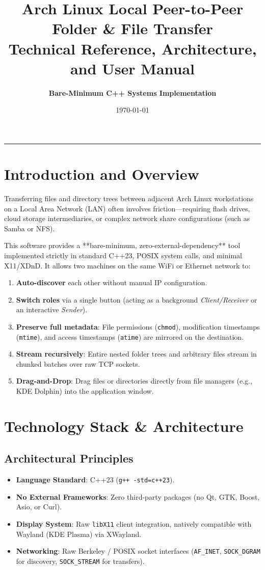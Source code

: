 \documentclass[11pt,a4paper]{article}
\title{\textbf{\Huge Arch Linux Local Peer-to-Peer Folder \& File Transfer}\\[0.3em]
\Large Technical Reference, Architecture, and User Manual}
\author{\textbf{Bare-Minimum C++ Systems Implementation}}
\date{\today}
\begin{document}
\maketitle
\tableofcontents
\vspace{1.5em}
\hrule
\vspace{1.5em}

\section{Introduction and Overview}
Transferring files and directory trees between adjacent Arch Linux workstations on a Local Area Network (LAN) often involves friction—requiring flash drives, cloud storage intermediaries, or complex network share configurations (such as Samba or NFS).

This software provides a **bare-minimum, zero-external-dependency** tool implemented strictly in standard C++23, POSIX system calls, and minimal X11/XDnD. It allows two machines on the same WiFi or Ethernet network to:
\begin{enumerate}
    \item \textbf{Auto-discover} each other without manual IP configuration.
    \item \textbf{Switch roles} via a single button (acting as a background \textit{Client/Receiver} or an interactive \textit{Sender}).
    \item \textbf{Preserve full metadata}: File permissions (\texttt{chmod}), modification timestamps (\texttt{mtime}), and access timestamps (\texttt{atime}) are mirrored on the destination.
    \item \textbf{Stream recursively}: Entire nested folder trees and arbitrary files stream in chunked batches over raw TCP sockets.
    \item \textbf{Drag-and-Drop}: Drag files or directories directly from file managers (e.g., KDE Dolphin) into the application window.
\end{enumerate}

\section{Technology Stack \& Architecture}

\subsection{Architectural Principles}
\begin{itemize}
    \item \textbf{Language Standard}: C++23 (\texttt{g++ -std=c++23}).
    \item \textbf{No External Frameworks}: Zero third-party packages (no Qt, GTK, Boost, Asio, or Curl).
    \item \textbf{Display System}: Raw \texttt{libX11} client integration, natively compatible with Wayland (KDE Plasma) via XWayland.
    \item \textbf{Networking}: Raw Berkeley / POSIX socket interfaces (\texttt{AF\_INET}, \texttt{SOCK\_DGRAM} for discovery, \texttt{SOCK\_STREAM} for transfers).
\end{itemize}
\end{document}
